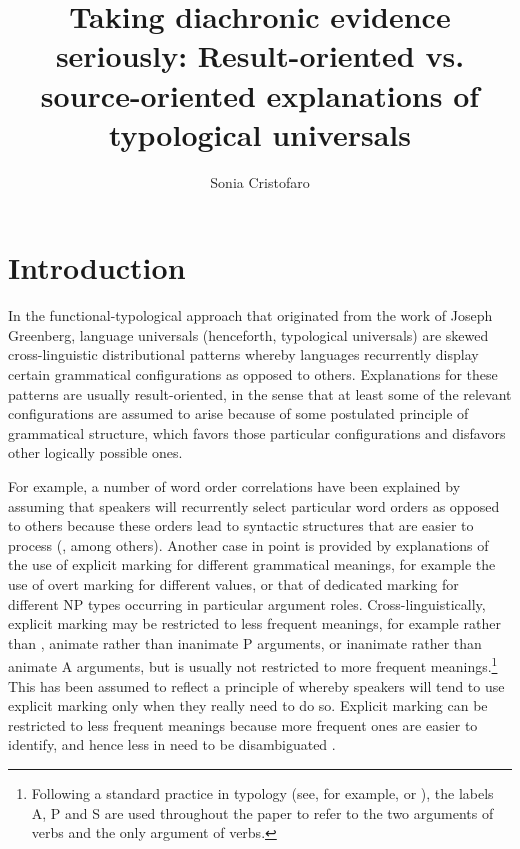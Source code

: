 \documentclass[output=paper]{langsci/langscibook}
\author{Sonia Cristofaro\affiliation{University of Pavia}}
\title{Taking diachronic evidence seriously: Result-oriented
  vs. source-oriented explanations of typological universals}
\begin{document}
\maketitle 
  
\label{p:cristofaro:evidenceseriously}
 

\section{Introduction}\label{intro}
In the functional-typological approach that originated from the work
of Joseph Greenberg, language universals (henceforth, typological
universals) are skewed cross-linguistic distributional patterns whereby languages recurrently display certain grammatical configurations as opposed to others. Explanations for these patterns are usually result-oriented, in the sense  that at least some of the relevant configurations are assumed to arise because of some postulated principle of grammatical structure, which favors those particular configurations and disfavors other logically possible ones.

For example, a number of word order correlations have been explained by assuming that speakers will recurrently select particular word orders as opposed to others because these orders lead to syntactic structures that are easier to process (\citealt{Hawkins2004},  among others). Another case in point is provided by explanations of the use of explicit marking for different grammatical meanings, for example the use of overt marking for different  values, or that of dedicated  marking for different NP types occurring in particular argument roles. Cross-linguistically, explicit marking may be restricted to less frequent meanings, for example  rather than , animate rather than
inanimate P arguments, or inanimate rather than animate A arguments, but
is usually not restricted to more frequent meanings.\footnote{Following a standard
    practice in typology (see, for example, \citealt{Comrie2} or \citealt{Dixon1994}), the labels A, P and S are used throughout
    the paper to refer to the two arguments of  verbs and
    the only argument of  verbs.} This has been assumed to reflect a principle of  whereby speakers will tend to use explicit marking only when they really need to do so. Explicit marking can be restricted to less frequent meanings because more frequent ones are easier to identify, and hence less in need to be disambiguated
\citep{Greenberg1966,Corbett2000,TU2,Martinmarkedness,Haspelmath2008}. 
\end{document}

